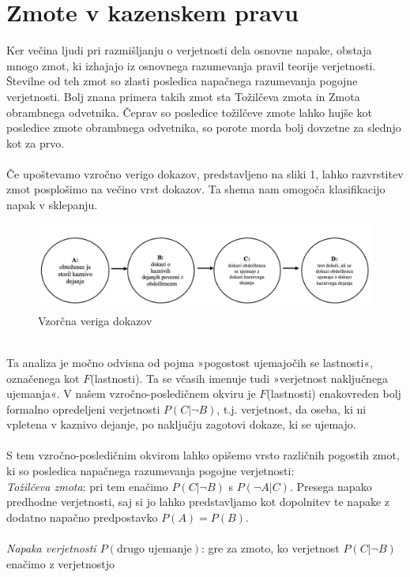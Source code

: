 \documentclass[12pt,a4paper]{amsart}
\theoremstyle{definition} %
\theoremstyle{plain} %
\begin{document}
\section{Zmote v kazenskem pravu}
Ker večina ljudi pri razmišljanju o verjetnosti dela osnovne napake, obstaja mnogo zmot, ki izhajajo iz osnovnega razumevanja pravil
teorije verjetnosti. Številne od teh zmot so zlasti posledica napačnega razumevanja pogojne verjetnosti. Bolj znana primera takih zmot sta
Tožilčeva zmota in Zmota obrambnega odvetnika. Čeprav so posledice tožilčeve zmote
lahko hujše kot posledice zmote obrambnega odvetnika, so porote morda bolj dovzetne za slednjo kot za prvo. \\\\
Če upoštevamo vzročno verigo dokazov, predstavljeno na sliki 1, lahko razvrstitev zmot posplošimo na večino vrst dokazov. Ta shema
nam omogoča klasifikacijo napak v sklepanju.
\begin{figure}[!ht]\label{fig:slika_3}
   \centering
   \includegraphics[scale=0.60]{slika_3.png}
   \caption{Vzorčna veriga dokazov}
\end{figure}
\\
Ta analiza je močno odvisna od pojma »pogostost ujemajočih se lastnosti«, označenega kot $F$(lastnosti). Ta se včasih imenuje
tudi »verjetnost naključnega ujemanja«. V našem vzročno-posledičnem okviru je $F$(lastnosti) enakovreden bolj formalno opredeljeni verjetnosti
$P(C \lvert \neg B)$, t.j. verjetnost, da oseba, ki ni vpletena v kaznivo dejanje, po naključju zagotovi dokaze, ki se ujemajo.\\\\
S tem vzročno-posledičnim okvirom lahko opišemo vrsto različnih pogostih zmot, ki so posledica napačnega razumevanja pogojne verjetnosti:\\
\textit{Tožilčeva zmota}: pri tem enačimo $P(C \lvert \neg B)$ s $P(\neg A \lvert C)$. Presega napako predhodne verjetnosti, saj si jo lahko 
predstavljamo kot dopolnitev te napake z dodatno napačno predpostavko $P(A) = P(B)$.\\\\
\textit{Napaka verjetnosti $P(\text{drugo ujemanje})$}: gre za zmoto, ko verjetnost $P(C \lvert \neg B)$ enačimo z verjetnostjo
\end{document}

